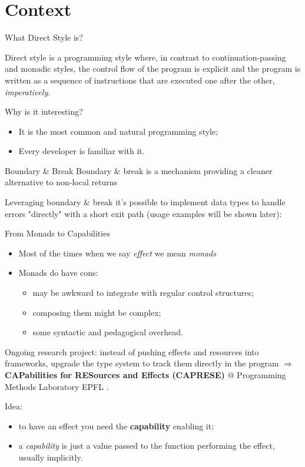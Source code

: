 \documentclass[aspectratio=1610,xcolor=dvipsnames]{beamer}
\begin{document}
\section{Context}
\begin{frame}{What Direct Style is?}
  \begin{block}{}
      Direct style is a programming style where, in contrast to continuation-passing and monadic styles, the control flow of the program is explicit and the program is written as a sequence of instructions that are executed one after the other, \emph{imperatively}.
  \end{block}
  Why is it interesting?
  \begin{itemize}
      \item It is the most common and natural programming style;
      \item Every developer is familiar with it.
  \end{itemize}
\end{frame}
%
\begin{frame}{Boundary \& Break \cite{scalar-gears}}
  Boundary \& break is a mechanism providing a cleaner alternative to non-local returns
  
\end{frame}
%
\begin{frame}
  Leveraging boundary \& break it's possible to implement data types to handle errors "directly" with a short exit path (usage examples will be shown later):
\end{frame}
%
\begin{frame}{From Monads to Capabilities}
  \begin{itemize}
    \item Most of the times when we say \emph{effect} we mean \emph{monads}
    \item Monads do have cons:
    \begin{itemize}
      \item may be awkward to integrate with regular control structures;
      \item composing them might be complex;
      \item some syntactic and pedagogical overhead.
    \end{itemize}
  \end{itemize}
  \begin{block}{}
    Ongoing research project: instead of pushing effects and resources into frameworks, upgrade the type system to track them directly in the program $\Rightarrow$ \textbf{CAPabilities for RESources and Effects (CAPRESE)} @ Programming Methods Laboratory EPFL \cite{capabilities}.
  \end{block}
  Idea:
  \begin{itemize}
    \item to have an effect you need the \textbf{capability} enabling it;
    \item a \textit{capability} is just a value passed to the function performing the effect, usually implicitly.
  \end{itemize}
\end{frame}
\end{document}
